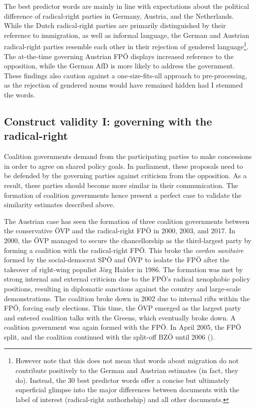 \documentclass{article}
\begin{document}
The best predictor words are mainly in line with expectations about the political difference of radical-right parties in Germany, Austria, and the Netherlands. While the Dutch radical-right parties are primarily distinguished by their reference to immigration, as well as informal language, the German and Austrian radical-right parties resemble each other in their rejection of gendered language\footnote{However note that this does not mean that words about migration do not contribute positively to the German and Austrian estimates (in fact, they do). Instead, the 30 best predictor words offer a concise but ultimately superficial glimpse into the major differences between documents with the label of interest (radical-right authorhship) and all other documents.}. The at-the-time governing Austrian FPÖ displays increased reference to the opposition, while the German AfD is more likely to address the government. These findings also caution against a one-size-fits-all approach to pre-processing, as the rejection of gendered nouns would have remained hidden had I stemmed the words.\par


\subsection{Construct validity I: governing with the radical-right}
Coalition governments demand from the participating parties to make concessions in order to agree on shared policy goals. In parliament, these proposals need to be defended by the governing parties against criticism from the opposition. As a result, these parties should become more similar in their communication. The formation of coalition governments hence present a perfect case to validate the similarity estimates described above. \par

The Austrian case has seen the formation of three coalition governments between the conservative ÖVP and the radical-right FPÖ in 2000, 2003, and 2017. In 2000, the ÖVP managed to secure the chancellorship as the third-largest party by forming a coalition with the radical-right FPÖ. This broke the \textit{cordon sanitaire} formed by the social-democrat SPÖ and ÖVP to isolate the FPÖ after the takeover of right-wing populist Jörg Haider in 1986. The formation was met by strong internal and external criticism due to the FPÖ's radical xenophobic policy positions, resulting in diplomatic sanctions against the country and large-scale demonstrations. The coalition broke down in 2002 due to internal rifts within the FPÖ, forcing early elections. This time, the ÖVP emerged as the largest party and entered coalition talks with the Greens, which eventually broke down. A coalition government was again formed with the FPÖ. In April 2005, the FPÖ split, and the coalition continued with the split-off BZÖ until 2006 (\cite{Luther2010}).\par
\end{document}
